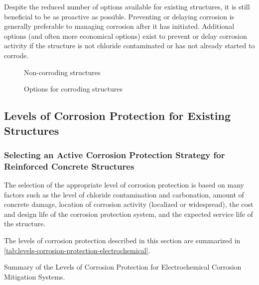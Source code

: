 Despite the reduced number of options available for existing structures, it is still beneficial to be as proactive as
possible. Preventing or delaying corrosion is generally preferable to managing corrosion after it has initiated.
Additional options (and often more economical options) exist to prevent or delay corrosion activity if the structure is
not chloride contaminated or has not already started to corrode.

\begin{figure}
  \caption{Non-corroding structures}
  \label{fig:non-corroding-structures}
\end{figure}

\begin{figure}
  \caption{Options for corroding structures}
  \label{fig:options-corrod-structures}
\end{figure}

\subsection{Levels of Corrosion Protection for Existing Structures}
\subsubsection{Selecting an Active Corrosion Protection Strategy for Reinforced Concrete Structures}
The selection of the appropriate level of corrosion protection is based on many factors such as the level of
chloride contamination and carbonation, amount of concrete damage, location of corrosion activity (localized or
widespread), the cost and design life of the corrosion protection system, and the expected service life of the structure.

The levels of corrosion protection described in this section are summarized in \cref{tab:levels-corrosion-protection-electrochemical}.

\begin{table}
  \caption{Summary of the Levels of Corrosion Protection for Electrochemical Corrosion Mitigation Systems.}
  \label{tab:levels-corrosion-protection-electrochemical}
\end{table}

